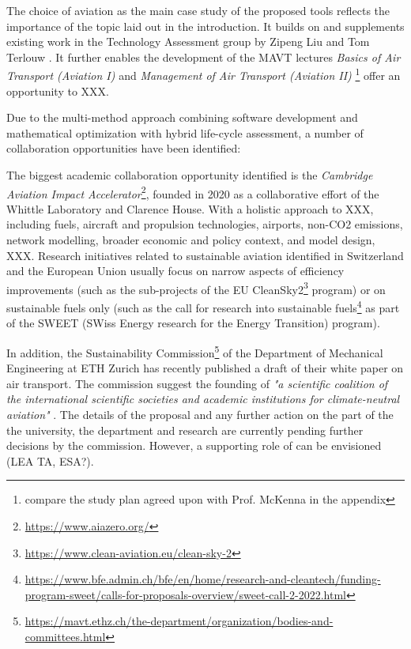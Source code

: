 \documentclass{article}
\begin{document}
    The choice of aviation as the main case study of the proposed tools reflects the importance of the topic laid out in the introduction. It builds on and supplements existing work in the Technology Assessment group by Zipeng Liu and Tom Terlouw \cite{terlouw_large-scale_2022}. It further enables the development of the MAVT lectures \textit{Basics of Air Transport (Aviation I)} and \textit{Management of Air Transport (Aviation II)} \footnote{compare the study plan agreed upon with Prof. McKenna in the appendix} offer an opportunity to XXX.
    
    Due to the multi-method approach combining software development and mathematical optimization with hybrid life-cycle assessment, a number of collaboration opportunities have been identified:
	
	The biggest academic collaboration opportunity identified is the \textit{Cambridge Aviation Impact Accelerator}\footnote{\url{https://www.aiazero.org/}}, founded in 2020 as a collaborative effort of the Whittle Laboratory and Clarence House. With a holistic approach to XXX, including fuels, aircraft and propulsion technologies, airports, non-CO2 emissions, network modelling, broader economic and policy context, and model design, XXX. Research initiatives related to sustainable aviation identified in Switzerland and the European Union usually focus on narrow aspects of efficiency improvements (such as the sub-projects of the EU CleanSky2\footnote{\url{https://www.clean-aviation.eu/clean-sky-2}} program) or on sustainable fuels only (such as the call for research into sustainable fuels\footnote{\url{https://www.bfe.admin.ch/bfe/en/home/research-and-cleantech/funding-program-sweet/calls-for-proposals-overview/sweet-call-2-2022.html}} as part of the SWEET (SWiss Energy research for the Energy Transition) program).
    
    In addition, the Sustainability Commission\footnote{\url{https://mavt.ethz.ch/the-department/organization/bodies-and-committees.html}} of the Department of Mechanical Engineering at ETH Zurich has recently published a draft of their white paper on air transport. The commission suggest the founding of  \textit{"a scientific coalition of the international scientific societies and academic institutions for climate-neutral aviation"} \cite{mazzotti_air_2022}. The details of the proposal and any further action on the part of the the university, the department and research are currently pending further decisions by the commission. However, a supporting role of can be envisioned (LEA TA, ESA?).
\end{document}
